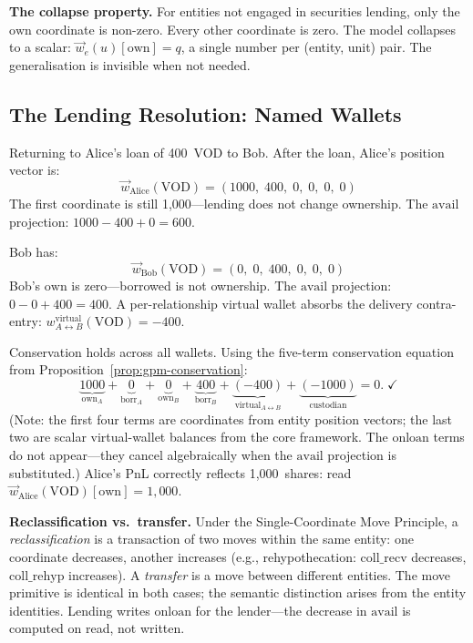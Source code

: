 \documentclass[11pt,a4paper]{article}
\begin{document}
\noindent\textbf{The collapse property.} For entities not engaged in securities lending, only the $\mathrm{own}$ coordinate is non-zero. Every other coordinate is zero. The model collapses to a scalar: $\vec{w}_e(u)[\mathrm{own}] = q$, a single number per (entity, unit) pair. The generalisation is invisible when not needed.

\subsection{The Lending Resolution: Named Wallets}
\label{sec:named-wallets}

Returning to Alice's loan of 400~VOD to Bob. After the loan, Alice's position vector is:
\[
\vec{w}_{\mathrm{Alice}}(\text{VOD}) = (1000,\; 400,\; 0,\; 0,\; 0,\; 0)
\]
The first coordinate is still 1{,}000---lending does not change ownership. The $\mathrm{avail}$ projection: $1000 - 400 + 0 = 600$. \checkmark

Bob has:
\[
\vec{w}_{\mathrm{Bob}}(\text{VOD}) = (0,\; 0,\; 400,\; 0,\; 0,\; 0)
\]
Bob's $\mathrm{own}$ is zero---borrowed is not ownership. The $\mathrm{avail}$ projection: $0 - 0 + 400 = 400$. A per-relationship virtual wallet absorbs the delivery contra-entry: $w^{\mathrm{virtual}}_{A \leftrightarrow B}(\text{VOD}) = -400$.

Conservation holds across all wallets. Using the five-term conservation equation from Proposition~\ref{prop:gpm-conservation}:
\[
\underbrace{1000}_{\mathrm{own}_A} + \underbrace{0}_{\mathrm{borr}_A} + \underbrace{0}_{\mathrm{own}_B} + \underbrace{400}_{\mathrm{borr}_B} + \underbrace{(-400)}_{\text{virtual}_{A \leftrightarrow B}} + \underbrace{(-1000)}_{\text{custodian}} = 0. \;\checkmark
\]
\noindent (Note: the first four terms are coordinates from entity position vectors; the last two are scalar virtual-wallet balances from the core framework. The $\mathrm{onloan}$ terms do not appear---they cancel algebraically when the $\mathrm{avail}$ projection is substituted.)
Alice's PnL correctly reflects 1{,}000~shares: read $\vec{w}_{\mathrm{Alice}}(\text{VOD})[\mathrm{own}] = 1{,}000$.

\noindent\textbf{Reclassification vs.\ transfer.} Under the Single-Coordinate Move Principle, a \emph{reclassification} is a transaction of two moves within the same entity: one coordinate decreases, another increases (e.g., rehypothecation: $\mathrm{coll\_recv}$ decreases, $\mathrm{coll\_rehyp}$ increases). A \emph{transfer} is a move between different entities. The move primitive is identical in both cases; the semantic distinction arises from the entity identities. Lending writes $\mathrm{onloan}$ for the lender---the decrease in $\mathrm{avail}$ is computed on read, not written.
\end{document}
